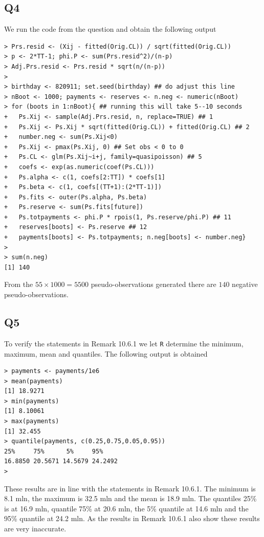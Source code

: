 \documentclass[11pt]{article}
\begin{document}
\subsection*{Q4}

We run the code from the question and obtain the following output

\begin{verbatim}
> Prs.resid <- (Xij - fitted(Orig.CL)) / sqrt(fitted(Orig.CL))
> p <- 2*TT-1; phi.P <- sum(Prs.resid^2)/(n-p)
> Adj.Prs.resid <- Prs.resid * sqrt(n/(n-p))
> 
> birthday <- 820911; set.seed(birthday) ## do adjust this line
> nBoot <- 1000; payments <- reserves <- n.neg <- numeric(nBoot)
> for (boots in 1:nBoot){ ## running this will take 5--10 seconds
+   Ps.Xij <- sample(Adj.Prs.resid, n, replace=TRUE) ## 1
+   Ps.Xij <- Ps.Xij * sqrt(fitted(Orig.CL)) + fitted(Orig.CL) ## 2
+   number.neg <- sum(Ps.Xij<0)
+   Ps.Xij <- pmax(Ps.Xij, 0) ## Set obs < 0 to 0
+   Ps.CL <- glm(Ps.Xij~i+j, family=quasipoisson) ## 5
+   coefs <- exp(as.numeric(coef(Ps.CL)))
+   Ps.alpha <- c(1, coefs[2:TT]) * coefs[1]
+   Ps.beta <- c(1, coefs[(TT+1):(2*TT-1)])
+   Ps.fits <- outer(Ps.alpha, Ps.beta)
+   Ps.reserve <- sum(Ps.fits[future])
+   Ps.totpayments <- phi.P * rpois(1, Ps.reserve/phi.P) ## 11
+   reserves[boots] <- Ps.reserve ## 12
+   payments[boots] <- Ps.totpayments; n.neg[boots] <- number.neg}
> 
> sum(n.neg)
[1] 140
\end{verbatim}

From the $55 \times 1000 = 5500$ pseudo-observations generated there are $140$ negative pseudo-observations.

\subsection*{Q5}
To verify the statements in Remark 10.6.1 we let \verb|R| determine the minimum, maximum, mean and quantiles. The following output is obtained

\begin{verbatim}
> payments <- payments/1e6
> mean(payments)
[1] 18.9271
> min(payments)
[1] 8.10061
> max(payments)
[1] 32.455
> quantile(payments, c(0.25,0.75,0.05,0.95))
25%     75%      5%     95% 
16.8850 20.5671 14.5679 24.2492 
>
\end{verbatim}

These results are in line with the statements in Remark 10.6.1. The minimum is 8.1 mln, the maximum is 32.5 mln and the mean is 18.9 mln. The quantiles 25\% is at 16.9 mln, quantile 75\% at 20.6 mln, the 5\% quantile at 14.6 mln and the 95\% quantile at 24.2 mln. As the results in Remark 10.6.1 also show these results are very inaccurate.
\end{document}
